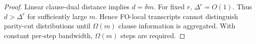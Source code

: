 \begin{proof}
Linear clause-dual distance implies $d = \delta m$.
For fixed $r$, $\Delta^r = O(1)$.
Thus $d > \Delta^r$ for sufficiently large $m$.
Hence FO-local transcripts cannot distinguish parity-cut distributions
until $\Omega(m)$ clause information is aggregated.
With constant per-step bandwidth,
$\Omega(m)$ steps are required.
\end{proof}

